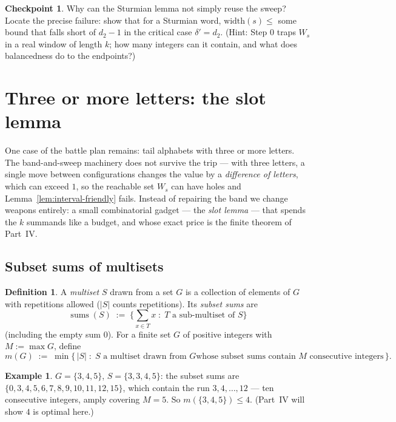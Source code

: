 \documentclass[11pt,reqno]{amsart}
\theoremstyle{plain}
\theoremstyle{definition}
\newtheorem{definition}[theorem]{Definition}
\newtheorem{example}[theorem]{Example}
\newtheorem{checkpoint}[theorem]{Checkpoint}   %
\theoremstyle{remark}
\newcommand{\ssum}{\operatorname{sums}}
\begin{document}
\begin{checkpoint}
Why can the Sturmian lemma not simply reuse the sweep? Locate the precise failure:
show that for a Sturmian word, $\mathrm{width}(s) \le$ some bound that falls short
of $d_2 - 1$ in the critical case $\delta' = d_2$. (Hint: Step 0 traps $W_s$ in a
real window of length $k$; how many integers can it contain, and what does
balancedness do to the endpoints?)
\end{checkpoint}

\section{Three or more letters: the slot lemma}\label{sec:slot}

One case of the battle plan remains: tail alphabets with three or more letters. The
band-and-sweep machinery does not survive the trip --- with three letters, a single
move between configurations changes the value by a \emph{difference of letters},
which can exceed $1$, so the reachable set $W_s$ can have holes and
Lemma~\ref{lem:interval-friendly} fails. Instead of repairing the band we change
weapons entirely: a small combinatorial gadget --- the \emph{slot lemma} --- that
spends the $k$ summands like a budget, and whose exact price is the finite theorem
of Part~IV.

\subsection{Subset sums of multisets}

\begin{definition}\label{def:msum}
A \emph{multiset} $S$ drawn from a set $G$ is a collection of elements of $G$ with
repetitions allowed ($|S|$ counts repetitions). Its \emph{subset sums} are
\[
  \ssum(S) \;:=\; \Big\{ \sum_{x \in T} x \;:\; T \text{ a sub-multiset of } S
  \Big\}
\]
(including the empty sum $0$). For a finite set $G$ of positive integers with $M :=
\max G$, define
\[
  m(G) \;:=\; \min\big\{\, |S| \;:\; S \text{ a multiset drawn from } G \text{
  whose subset sums contain $M$ consecutive integers} \,\big\} .
\]
\end{definition}

\begin{example}\label{ex:msum}
$G = \{3, 4, 5\}$, $S = \{3, 3, 4, 5\}$: the subset sums are
$\{0, 3, 4, 5, 6, 7, 8, 9, 10, 11, 12, 15\}$, which contain the run $3, 4, \dots,
12$ --- ten consecutive integers, amply covering $M = 5$. So $m(\{3,4,5\}) \le 4$.
(Part~IV will show $4$ is optimal here.)
\end{example}
\end{document}
